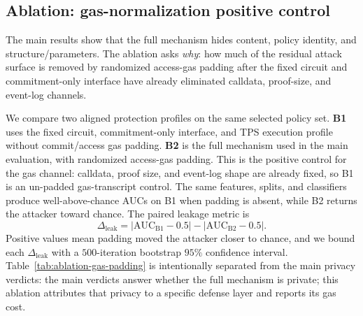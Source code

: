 \subsection{Ablation: gas-normalization positive control}
\label{sec:eval-ablation}

The main results show that the full mechanism hides content, policy identity, and structure/parameters. The ablation asks \emph{why}: how much of the residual attack surface is removed by randomized access-gas padding after the fixed circuit and commitment-only interface have already eliminated calldata, proof-size, and event-log
channels.

We compare two aligned protection profiles on the same selected policy set.
\textbf{B1} uses the fixed circuit, commitment-only interface, and TPS execution profile without commit/access gas padding.
\textbf{B2} is the full mechanism used in the main evaluation, with randomized access-gas padding.
This is the positive control for the gas channel: calldata, proof size, and event-log shape are already fixed, so B1 is an un-padded gas-transcript control.
The same features, splits, and classifiers produce well-above-chance AUCs on B1 when padding is absent, while B2 returns the attacker toward chance.
The paired leakage metric is
%
\[
	\Delta_{\text{leak}} =
	|\mathrm{AUC}_{\mathrm{B1}} - 0.5| -
	|\mathrm{AUC}_{\mathrm{B2}} - 0.5|.
\]
%
Positive values mean padding moved the attacker closer to chance, and we bound each $\Delta_{\text{leak}}$ with a $500$-iteration bootstrap $95\%$ confidence interval.
Table~\ref{tab:ablation-gas-padding} is intentionally separated from the main privacy verdicts: the main verdicts answer whether the full mechanism is private; this ablation attributes that privacy to a specific defense layer and reports its gas cost.

